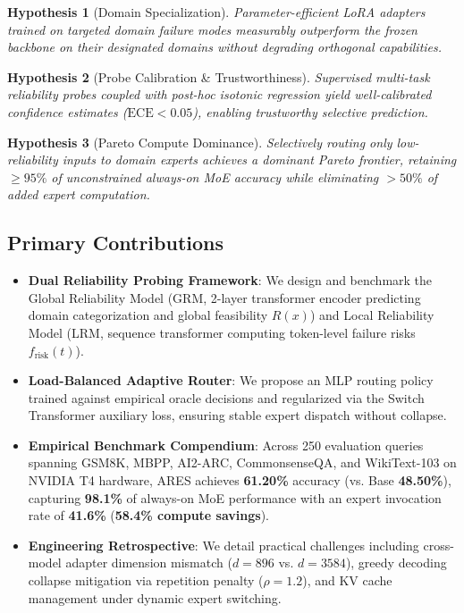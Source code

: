 \documentclass[journal,10pt,twocolumn]{IEEEtran}
\newtheorem{hypothesis}{Hypothesis}
\begin{document}
\begin{hypothesis}[Domain Specialization]
Parameter-efficient LoRA adapters trained on targeted domain failure modes measurably outperform the frozen backbone on their designated domains without degrading orthogonal capabilities.
\end{hypothesis}

\begin{hypothesis}[Probe Calibration \& Trustworthiness]
Supervised multi-task reliability probes coupled with post-hoc isotonic regression yield well-calibrated confidence estimates ($\text{ECE} < 0.05$), enabling trustworthy selective prediction.
\end{hypothesis}

\begin{hypothesis}[Pareto Compute Dominance]
Selectively routing only low-reliability inputs to domain experts achieves a dominant Pareto frontier, retaining $\ge 95\%$ of unconstrained always-on MoE accuracy while eliminating $> 50\%$ of added expert computation.
\end{hypothesis}

\subsection{Primary Contributions}
\begin{itemize}
    \item \textbf{Dual Reliability Probing Framework}: We design and benchmark the Global Reliability Model (GRM, 2-layer transformer encoder predicting domain categorization and global feasibility $R(x)$) and Local Reliability Model (LRM, sequence transformer computing token-level failure risks $f_{\text{risk}}(t)$).
    \item \textbf{Load-Balanced Adaptive Router}: We propose an MLP routing policy trained against empirical oracle decisions and regularized via the Switch Transformer auxiliary loss, ensuring stable expert dispatch without collapse.
    \item \textbf{Empirical Benchmark Compendium}: Across 250 evaluation queries spanning GSM8K, MBPP, AI2-ARC, CommonsenseQA, and WikiText-103 on NVIDIA T4 hardware, ARES achieves \textbf{61.20\%} accuracy (vs. Base \textbf{48.50\%}), capturing \textbf{98.1\%} of always-on MoE performance with an expert invocation rate of \textbf{41.6\%} (\textbf{58.4\% compute savings}).
    \item \textbf{Engineering Retrospective}: We detail practical challenges including cross-model adapter dimension mismatch ($d=896$ vs. $d=3584$), greedy decoding collapse mitigation via repetition penalty ($\rho = 1.2$), and KV cache management under dynamic expert switching.
\end{itemize}
\end{document}
